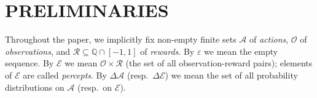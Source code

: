 \documentclass[twoside]{article}
\begin{document}
\section{PRELIMINARIES}


Throughout the paper, we implicitly
fix non-empty finite sets $\mathcal A$ of \emph{actions},
$\mathcal O$ of \emph{observations},
and $\mathcal R\subseteq \mathbb Q\cap [-1,1]$ of \emph{rewards}.
By $\varepsilon$ we mean the empty sequence.
By $\mathcal E$ we mean $\mathcal O\times\mathcal R$ (the set of all observation-reward
pairs); elements of $\mathcal E$ are called \emph{percepts}.
By $\Delta\mathcal A$ (resp.\ $\Delta\mathcal E$) we mean the set of all
probability distributions on $\mathcal A$ (resp.\ on $\mathcal E$).
\end{document}
